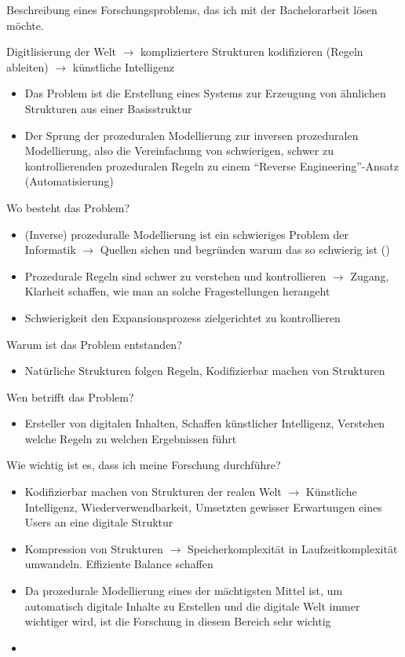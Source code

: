 Beschreibung eines Forschungsproblems, das ich mit der Bachelorarbeit lösen möchte.

Digitlisierung der Welt $\rightarrow$ kompliziertere Strukturen kodifizieren (Regeln ableiten) $\rightarrow$ künstliche
Intelligenz

\begin{itemize}
    \item Das Problem ist die Erstellung eines Systems zur Erzeugung von ähnlichen Strukturen aus einer Basisstruktur
    \item Der Sprung der prozeduralen Modellierung zur inversen prozeduralen Modellierung, also die Vereinfachung von schwierigen,
    schwer zu kontrollierenden prozeduralen Regeln zu einem "`Reverse Engineering"'-Ansatz (Automatisierung)
\end{itemize}

Wo besteht das Problem?

\begin{itemize}
    \item (Inverse) prozeduralle Modellierung ist ein schwieriges Problem der Informatik $\rightarrow$ Quellen sichen und
    begründen warum das so schwierig ist (\cite{aliaga_2016})
    \item Prozedurale Regeln sind schwer zu verstehen und kontrollieren $\rightarrow$ Zugang, Klarheit schaffen, wie man an
    solche Fragestellungen herangeht
    \item Schwierigkeit den Expansionsprozess zielgerichtet zu kontrollieren~\cite{prusinkiewicz_1990}
\end{itemize}

Warum ist das Problem entstanden?

\begin{itemize}
    \item Natürliche Strukturen folgen Regeln, Kodifizierbar machen von Strukturen
\end{itemize}

Wen betrifft das Problem?

\begin{itemize}
    \item Ersteller von digitalen Inhalten, Schaffen künstlicher Intelligenz, Verstehen welche Regeln zu welchen Ergebnissen führt
\end{itemize}

Wie wichtig ist es, dass ich meine Forschung durchführe?

\begin{itemize}
    \item Kodifizierbar machen von Strukturen der realen Welt $\rightarrow$ Künstliche Intelligenz,  Wiederverwendbarkeit,
    Umsetzten gewisser Erwartungen eines Users an eine digitale Struktur
    \item Kompression von Strukturen $\rightarrow$ Speicherkomplexität in Laufzeitkomplexität umwandeln.
    Effiziente Balance schaffen
    \item Da prozedurale Modellierung eines der mächtigsten Mittel ist, um automatisch digitale Inhalte zu Erstellen und die
    digitale Welt immer wichtiger wird, ist die Forschung in diesem Bereich sehr wichtig
    \item
\end{itemize}

